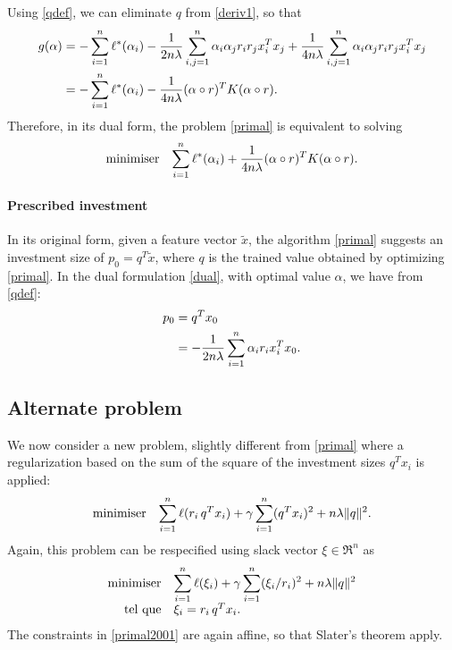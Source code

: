 Using \eqref{qdef}, we can eliminate $q$ from \eqref{deriv1}, so that
\begin{align}
  g(\alpha) &= -\sum_{i=1}^n \ell^*(\alpha_i) - \frac{1}{2n\lambda}\sum_{i,j=1}^n \alpha_i\alpha_jr_ir_jx_i^Tx_j + \frac{1}{4n\lambda}
         \sum_{i,j=1}^n \alpha_i\alpha_jr_ir_jx_i^Tx_j\\
       &= -\sum_{i=1}^n \ell^*(\alpha_i) - \frac{1}{4n\lambda}(\alpha \circ r)^TK(\alpha \circ r). 
\end{align}
Therefore, in its dual form, the problem \eqref{primal} is equivalent to solving
\begin{equation}
  \label{dual}
  \begin{array}{ll} \displaystyle{\operatorname*{minimiser}_{}} & \displaystyle{\sum_{i=1}^n\ell^*(\alpha_i) + \frac{1}{4n\lambda}(\alpha \circ r)^TK(\alpha \circ r).} \end{array}
\end{equation}

\paragraph{Prescribed investment}

In its original form, given a feature vector $\tilde x$, the algorithm \eqref{primal}
suggests an investment size of $p_0=q^T\tilde x$, where $q$ is the trained value obtained by
optimizing \eqref{primal}. In the dual formulation \eqref{dual}, with optimal value
$\alpha$, we have from \eqref{qdef}:
\begin{align}
  p_0 &= q^Tx_0\\
      &= - \frac{1}{2n\lambda}\sum_{i=1}^n \alpha_ir_ix_i^Tx_0.
\end{align}


\subsection{Alternate problem}

We now consider a new problem, slightly different from \eqref{primal} where a
regularization based on the sum of the square of the investment sizes $q^Tx_i$ is applied:
\begin{equation}
  \label{primal2000}
  \begin{array}{ll} \displaystyle{\operatorname*{minimiser}_{}} & \displaystyle{\sum_{i=1}^n\ell(r_i\,q^Tx_i) + \gamma\sum_{i=1}^n(q^Tx_i)^2 + n\lambda\|q\|^2.} \end{array}
\end{equation}
Again, this problem can be respecified using slack vector $\xi \in \Re^n$ as
\begin{align}
  \minimizeEquationSt{\label{primal2001}\sumi \ell(\xi_i) + \gamma\sumi(\xi_i/r_i)^2 + n\lambda\|q\|^2}[\xi_i = r_i\,q^Tx_i.]
\end{align}
The constraints in \eqref{primal2001} are again affine, so that Slater's theorem apply.

